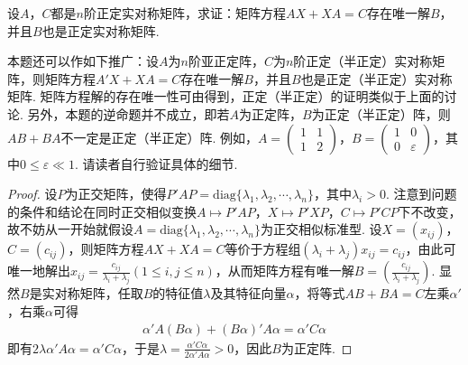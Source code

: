 \documentclass[../../main.tex]{subfiles}%
\begin{document}
\begin{proposition}\label{proposition:例9.69}
设\(A\)，\(C\)都是\(n\)阶正定实对称矩阵，求证：矩阵方程\(AX + XA = C\)存在唯一解\(B\)，并且\(B\)也是正定实对称矩阵.
\end{proposition}
\begin{remark}
本题还可以作如下推广：设\(A\)为\(n\)阶亚正定阵，\(C\)为\(n\)阶正定（半正定）实对称矩阵，则矩阵方程\(A'X + XA = C\)存在唯一解\(B\)，并且\(B\)也是正定（半正定）实对称矩阵. 矩阵方程解的存在唯一性可由得到，正定（半正定）的证明类似于上面的讨论. 另外，本题的逆命题并不成立，即若\(A\)为正定阵，\(B\)为正定（半正定）阵，则\(AB + BA\)不一定是正定（半正定）阵. 例如，\(A=\begin{pmatrix}1&1\\1&2\end{pmatrix}\)，\(B=\begin{pmatrix}1&0\\0&\varepsilon\end{pmatrix}\)，其中\(0\leqslant \varepsilon\ll1\). 请读者自行验证具体的细节.
\end{remark}
\begin{proof}

设\(P\)为正交矩阵，使得\(P'AP=\mathrm{diag}\{\lambda_1,\lambda_2,\cdots,\lambda_n\}\)，其中\(\lambda_i > 0\). 注意到问题的条件和结论在同时正交相似变换\(A\mapsto P'AP\)，\(X\mapsto P'XP\)，\(C\mapsto P'CP\)下不改变，故不妨从一开始就假设\(A = \mathrm{diag}\{\lambda_1,\lambda_2,\cdots,\lambda_n\}\)为正交相似标准型. 设\(X=(x_{ij})\)，\(C=(c_{ij})\)，则矩阵方程\(AX + XA = C\)等价于方程组\((\lambda_i + \lambda_j)x_{ij}=c_{ij}\)，由此可唯一地解出\(x_{ij}=\frac{c_{ij}}{\lambda_i + \lambda_j}(1\leqslant  i,j\leqslant  n)\)，从而矩阵方程有唯一解\(B = (\frac{c_{ij}}{\lambda_i + \lambda_j})\). 显然\(B\)是实对称矩阵，任取\(B\)的特征值\(\lambda\)及其特征向量\(\alpha\)，将等式\(AB + BA = C\)左乘\(\alpha'\)，右乘\(\alpha\)可得
\begin{align*}
\alpha'A(B\alpha)+(B\alpha)'A\alpha=\alpha'C\alpha
\end{align*}
即有\(2\lambda\alpha'A\alpha=\alpha'C\alpha\)，于是\(\lambda=\frac{\alpha'C\alpha}{2\alpha'A\alpha}>0\)，因此\(B\)为正定阵.

\end{proof}
\end{document}
